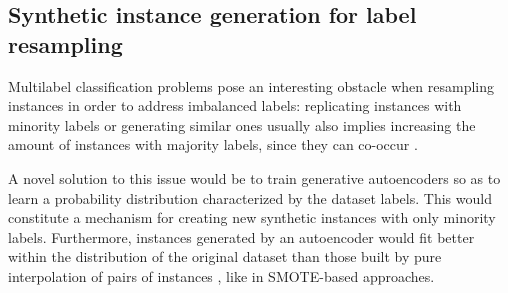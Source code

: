 \subsection{Synthetic instance generation for label resampling}

Multilabel classification problems pose an interesting obstacle when resampling instances in order to address imbalanced labels: replicating instances with minority labels or generating similar ones usually also implies increasing the amount of instances with majority labels, since they can co-occur . 

A novel solution to this issue would be to train generative autoencoders so as to learn a probability distribution characterized by the dataset labels. This would constitute a mechanism for creating new synthetic instances with only minority labels. Furthermore, instances generated by an autoencoder would fit better within the distribution of the original dataset than those built by pure interpolation of pairs of instances , like in SMOTE-based approaches.

